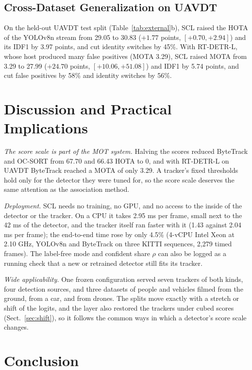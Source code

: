 \documentclass[pdflatex,sn-mathphys-num,iicol]{sn-jnl}
\newcommand{\scl}{SCL}
\begin{document}
\subsection{Cross-Dataset Generalization on UAVDT}\label{sec:visdrone}
On the held-out UAVDT test split (Table~\ref{tab:external}b), \scl{} raised the HOTA of the YOLOv8n
stream from 29.05 to 30.83 ($+1.77$ points, $[+0.70,+2.94]$) and its IDF1 by 3.97 points, and cut
identity switches by 45\%. With RT-DETR-L, whose host produced many false positives (MOTA 3.29),
\scl{} raised MOTA from 3.29 to 27.99 ($+24.70$ points, $[+10.06,+51.08]$) and IDF1 by 5.74 points,
and cut false positives by 58\% and identity switches by 56\%.
\section{Discussion and Practical Implications}\label{sec:discussion}

\emph{The score scale is part of the MOT system.} Halving the scores reduced ByteTrack and OC-SORT
from 67.70 and 66.43 HOTA to 0, and with RT-DETR-L on UAVDT ByteTrack reached a MOTA of only 3.29.
A tracker's fixed thresholds hold only for the detector they were tuned for, so the score scale
deserves the same attention as the association method.

\emph{Deployment.} \scl{} needs no training, no GPU, and no access to the inside of the detector or
the tracker. On a CPU it takes 2.95 ms per frame, small next to the 42 ms of the detector, and the
tracker itself ran faster with it (1.43 against 2.04 ms per frame); the end-to-end time rose by
only 4.5\% (4-vCPU Intel Xeon at 2.10 GHz, YOLOv8n and ByteTrack on three KITTI sequences, 2,279
timed frames). The label-free mode and confident share $\rho$ can also be logged as a running check
that a new or retrained detector still fits its tracker.

\emph{Wide applicability.} One frozen configuration served seven trackers of both kinds, four
detection sources, and three datasets of people and vehicles filmed from the ground, from a car,
and from drones. The splits move exactly with a stretch or shift of the logits, and the layer also
restored the trackers under cubed scores (Sect.~\ref{sec:shift}), so it follows the common ways in
which a detector's score scale changes.
\FloatBarrier
\section{Conclusion}\label{sec:conclusion}
\end{document}
